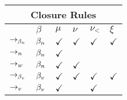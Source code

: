 \begin{table}
	\centering
	\begin{tabularx}{\linewidth}{|X|XXXXX|}
		\hline
		\multicolumn{6}{|c|}{\textbf{Closure Rules}}\\
		\hline
		& {$\beta$} & $\mu$ & $\nu$ & $\nu_<$ & $\xi$ \\
		\hline
		$\to_{\beta_n}$ & $\beta_n$ & $\checkmark$ & $\checkmark$ & $\checkmark$ & $\checkmark$ \\
		\hline
		$\to_n$  & $\beta_n$ & $\checkmark$ & 						 &  & \\
		\hline
		$\to_w$  & $\beta_n$ & $\checkmark$ & $\checkmark$ & & \\
		\hline
    $\to_{\beta_v}$ & $\beta_v$ & $\checkmark$ & $\checkmark$ & $\checkmark$ & $\checkmark$ \\
    \hline
    $\to_v$  & $\beta_v$ & $\checkmark$ & 						 & $\checkmark$ & \\
    \hline
	\end{tabularx}
	\end{table}
